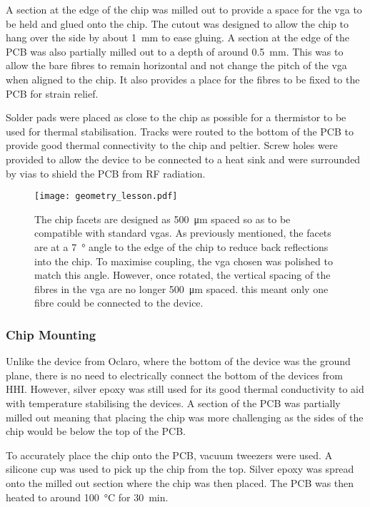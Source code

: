 A section at the edge of the chip was milled out to provide a space for the \ac{vga} to be held and glued onto the chip. The cutout was designed to allow the chip to hang over the side by about \SI{1}{\mm} to ease gluing. A section at the edge of the PCB was also partially milled out to a depth of around \SI{0.5}{\mm}. This was to allow the bare fibres to remain horizontal and not change the pitch of the \ac{vga} when aligned to the chip. It also provides a place for the fibres to be fixed to the PCB for strain relief.

Solder pads were placed as close to the chip as possible for a thermistor to be used for thermal stabilisation. Tracks were routed to the bottom of the PCB to provide good thermal connectivity to the chip and peltier. Screw holes were provided to allow the device to be connected to a heat sink and were surrounded by vias to shield the PCB from RF radiation.

\begin{figure}[t]
	\centering
	\texttt{[image: geometry\_lesson.pdf]}
	\caption[A quick lesson in geometry for edge coupling]{The chip facets are designed as \SI{500}{\um} spaced so as to be compatible with standard \acp{vga}. As previously mentioned, the facets are at a \SI{7}{\degree} angle to the edge of the chip to reduce back reflections into the chip. To maximise coupling, the \ac{vga} chosen was polished to match this angle. However, once rotated, the vertical spacing of the fibres in the \ac{vga} are no longer \SI{500}{\um} spaced. this meant only one fibre could be connected to the device.}
	\label{fig:geometry_lesson}
\end{figure}

\subsubsection*{Chip Mounting}

Unlike the device from Oclaro, where the bottom of the device was the ground plane, there is no need to electrically connect the bottom of the devices from HHI. However, silver epoxy was still used for its good thermal conductivity to aid with temperature stabilising the devices. A section of the PCB was partially milled out meaning that placing the chip was more challenging as the sides of the chip would be below the top of the PCB.

To accurately place the chip onto the PCB, vacuum tweezers were used. A silicone cup was used to pick up the chip from the top. Silver epoxy was spread onto the milled out section where the chip was then placed. The PCB was then heated to around \SI{100}{\celsius} for \SI{30}{\minute}.

